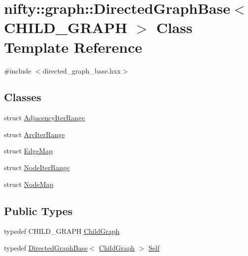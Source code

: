 \hypertarget{classnifty_1_1graph_1_1DirectedGraphBase}{}\section{nifty\+:\+:graph\+:\+:Directed\+Graph\+Base$<$ C\+H\+I\+L\+D\+\_\+\+G\+R\+A\+PH $>$ Class Template Reference}
\label{classnifty_1_1graph_1_1DirectedGraphBase}


{\ttfamily \#include $<$directed\+\_\+graph\+\_\+base.\+hxx$>$}

\subsection*{Classes}
\begin{DoxyCompactItemize}
\item 
struct \hyperlink{structnifty_1_1graph_1_1DirectedGraphBase_1_1AdjacencyIterRange}{Adjacency\+Iter\+Range}
\item 
struct \hyperlink{structnifty_1_1graph_1_1DirectedGraphBase_1_1ArcIterRange}{Arc\+Iter\+Range}
\item 
struct \hyperlink{structnifty_1_1graph_1_1DirectedGraphBase_1_1EdgeMap}{Edge\+Map}
\item 
struct \hyperlink{structnifty_1_1graph_1_1DirectedGraphBase_1_1NodeIterRange}{Node\+Iter\+Range}
\item 
struct \hyperlink{structnifty_1_1graph_1_1DirectedGraphBase_1_1NodeMap}{Node\+Map}
\end{DoxyCompactItemize}
\subsection*{Public Types}
\begin{DoxyCompactItemize}
\item 
typedef C\+H\+I\+L\+D\+\_\+\+G\+R\+A\+PH \hyperlink{classnifty_1_1graph_1_1DirectedGraphBase_a583e01641aec296b9bc33a346f90a216}{Child\+Graph}
\item 
typedef \hyperlink{classnifty_1_1graph_1_1DirectedGraphBase}{Directed\+Graph\+Base}$<$ \hyperlink{classnifty_1_1graph_1_1DirectedGraphBase_a583e01641aec296b9bc33a346f90a216}{Child\+Graph} $>$ \hyperlink{classnifty_1_1graph_1_1DirectedGraphBase_ae772bf5744b9fe1af63eb1418b7ab261}{Self}
\end{DoxyCompactItemize}
